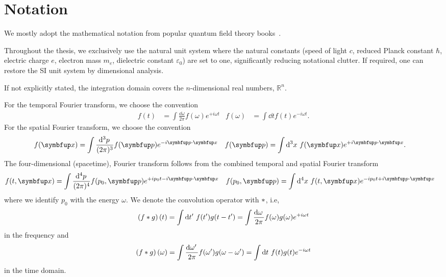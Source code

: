 \section*{Notation}

We mostly adopt the mathematical notation from popular quantum field theory books~\cite{Weinberg1995,Peskin1995}.

Throughout the thesis, we exclusively use the natural unit system where the natural constants (speed of light $c$, reduced Planck constant $\hbar$, electric charge $e$, electron mass $m_e$, dielectric constant $\varepsilon_0$) are set to one, significantly reducing notational clutter.
If required, one can restore the SI unit system by dimensional analysis.

If not explicitly stated, the integration domain covers the $n$-dimensional real numbers, $\mathbb{R}^n$.

For the temporal Fourier transform, we choose the convention
\begin{align*}
	f(t)
	&=
	\int\frac{\dd{\omega}}{2\pi}
	f(\omega)
	e^{+i\omega t}
	&
	f(\omega)
	&=
	\int\dd{t}
	f(t)
	e^{-i\omega t}
	.
\end{align*}
For the spatial Fourier transform, we choose the convention
\begin{align*}
	f(\vb{x})
	&=
	\int\frac{\dd[3]{p}}{(2\pi)^3}
	f(\vb{p})
	e^{-i\vb{p}\vdot\vb{x}}
	&
	f(\vb{p})
	&=
	\int\dd[3]{x}
	f(\vb{x})
	e^{+i\vb{p}\vdot\vb{x}}
	.
\end{align*}
The four-dimensional (spacetime), Fourier transform follows from the combined temporal and spatial Fourier transform
\begin{align*}
	f(t,\vb{x})
	&=
	\int\frac{\dd[4]{p}}{(2\pi)^4}
	f(p_0,\vb{p})
	e^{+ip_0 t-i\vb{p}\vdot\vb{x}}
	&
	f(p_0,\vb{p})
	&=
	\int\dd[4]{x}
	f(t,\vb{x})
	e^{-ip_0 t+i\vb{p}\vdot\vb{x}}
\end{align*}
where we identify $p_0$ with the energy $\omega$.
We denote the convolution operator with $\ast$, i.e,
\begin{equation*}
	\left(f\conv g\right)(t)
	=
	\int\dd{t^\prime}
	f(t^\prime)
	g(t-t^\prime)
	=
	\int\frac{\dd{\omega}}{2\pi}
	f(\omega)
	g(\omega)
	e^{+i\omega t}
\end{equation*}
in the frequency and
\begin{equation*}
	\left(f\conv g\right)(\omega)
	=
	\int\frac{\dd{\omega^\prime}}{2\pi}
	f(\omega^\prime)
	g(\omega-\omega^\prime)
	=
	\int\dd{t}
	f(t)
	g(t)
	e^{-i\omega t}
\end{equation*}
in the time domain.

